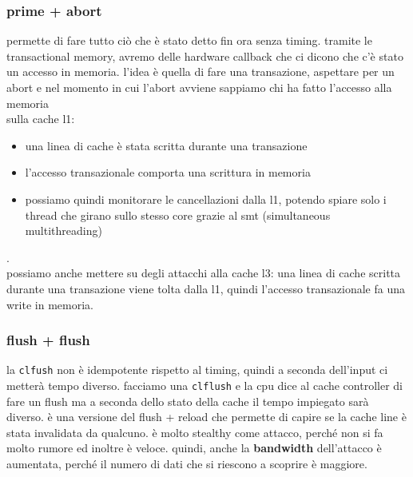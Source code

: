 \documentclass[12pt, oneside]{extbook} %
\begin{document}
\subsubsection{prime + abort}
permette di fare tutto ciò che è stato detto fin ora senza timing. tramite le transactional memory, avremo delle hardware callback che ci dicono che c'è stato un accesso in memoria. l'idea è quella di fare una transazione, aspettare per un abort e nel momento in cui l'abort avviene sappiamo chi ha fatto l'accesso alla memoria\\sulla cache l1:
\begin{itemize}
	\item una linea di cache è stata scritta durante una transazione
	\item l'accesso transazionale comporta una scrittura in memoria
	\item possiamo quindi monitorare le cancellazioni dalla l1, potendo spiare solo i thread che girano sullo stesso core grazie al smt (simultaneous multithreading)
\end{itemize}.\\ possiamo anche mettere su degli attacchi alla cache l3: una linea di cache scritta durante una transazione viene tolta dalla l1, quindi l'accesso transazionale fa una write in memoria.
\subsubsection{flush + flush}
la \texttt{clfush} non è idempotente rispetto al timing, quindi a seconda dell'input ci metterà tempo diverso. facciamo una \texttt{clflush} e la cpu dice al cache controller di fare un flush ma a seconda dello stato della cache il tempo impiegato sarà diverso. è una versione del flush + reload che permette di capire se la cache line è stata invalidata da qualcuno. è molto stealthy come attacco, perché non si fa molto rumore ed inoltre è veloce. quindi, anche la \textbf{bandwidth} dell'attacco è aumentata, perché il numero di dati che si riescono a scoprire è maggiore.
\end{document}

